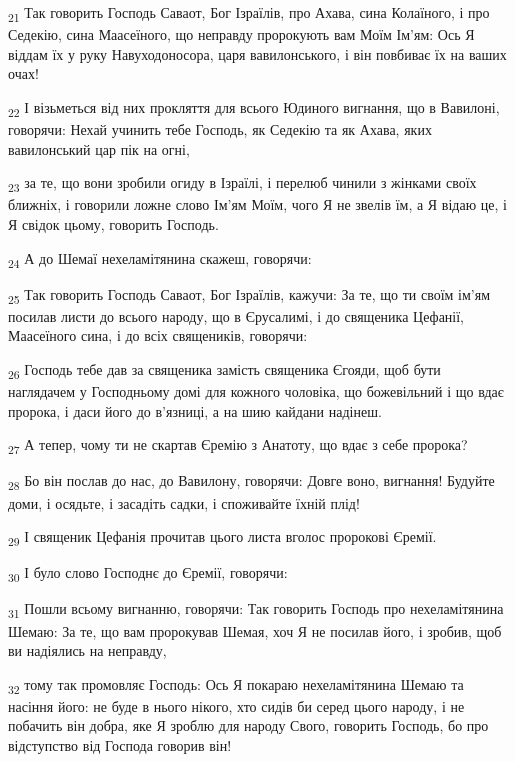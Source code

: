 \begin{tcolorbox}
\textsubscript{21} Так говорить Господь Саваот, Бог Ізраїлів, про Ахава, сина Колаїного, і про Седекію, сина Маасеїного, що неправду пророкують вам Моїм Ім'ям: Ось Я віддам їх у руку Навуходоносора, царя вавилонського, і він повбиває їх на ваших очах!
\end{tcolorbox}
\begin{tcolorbox}
\textsubscript{22} І візьметься від них прокляття для всього Юдиного вигнання, що в Вавилоні, говорячи: Нехай учинить тебе Господь, як Седекію та як Ахава, яких вавилонський цар пік на огні,
\end{tcolorbox}
\begin{tcolorbox}
\textsubscript{23} за те, що вони зробили огиду в Ізраїлі, і перелюб чинили з жінками своїх ближніх, і говорили ложне слово Ім'ям Моїм, чого Я не звелів їм, а Я відаю це, і Я свідок цьому, говорить Господь.
\end{tcolorbox}
\begin{tcolorbox}
\textsubscript{24} А до Шемаї нехеламітянина скажеш, говорячи:
\end{tcolorbox}
\begin{tcolorbox}
\textsubscript{25} Так говорить Господь Саваот, Бог Ізраїлів, кажучи: За те, що ти своїм ім'ям посилав листи до всього народу, що в Єрусалимі, і до священика Цефанії, Маасеїного сина, і до всіх священиків, говорячи:
\end{tcolorbox}
\begin{tcolorbox}
\textsubscript{26} Господь тебе дав за священика замість священика Єгояди, щоб бути наглядачем у Господньому домі для кожного чоловіка, що божевільний і що вдає пророка, і даси його до в'язниці, а на шию кайдани надінеш.
\end{tcolorbox}
\begin{tcolorbox}
\textsubscript{27} А тепер, чому ти не скартав Єремію з Анатоту, що вдає з себе пророка?
\end{tcolorbox}
\begin{tcolorbox}
\textsubscript{28} Бо він послав до нас, до Вавилону, говорячи: Довге воно, вигнання! Будуйте доми, і осядьте, і засадіть садки, і споживайте їхній плід!
\end{tcolorbox}
\begin{tcolorbox}
\textsubscript{29} І священик Цефанія прочитав цього листа вголос пророкові Єремії.
\end{tcolorbox}
\begin{tcolorbox}
\textsubscript{30} І було слово Господнє до Єремії, говорячи:
\end{tcolorbox}
\begin{tcolorbox}
\textsubscript{31} Пошли всьому вигнанню, говорячи: Так говорить Господь про нехеламітянина Шемаю: За те, що вам пророкував Шемая, хоч Я не посилав його, і зробив, щоб ви надіялись на неправду,
\end{tcolorbox}
\begin{tcolorbox}
\textsubscript{32} тому так промовляє Господь: Ось Я покараю нехеламітянина Шемаю та насіння його: не буде в нього нікого, хто сидів би серед цього народу, і не побачить він добра, яке Я зроблю для народу Свого, говорить Господь, бо про відступство від Господа говорив він!
\end{tcolorbox}
